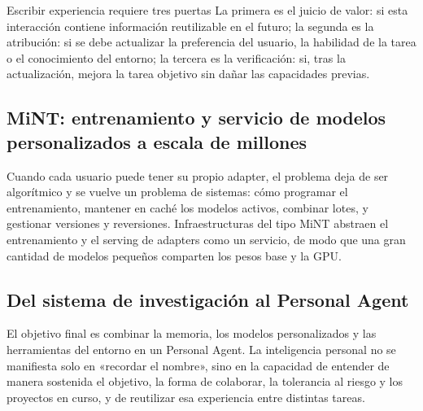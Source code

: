 

\begin{knowledgebox}{Escribir experiencia requiere tres puertas}
La primera es el juicio de valor: si esta interacción contiene información reutilizable en el futuro; la segunda es la atribución: si se debe actualizar la preferencia del usuario, la habilidad de la tarea o el conocimiento del entorno; la tercera es la verificación: si, tras la actualización, mejora la tarea objetivo sin dañar las capacidades previas.
\end{knowledgebox}

\subsection{MiNT: entrenamiento y servicio de modelos personalizados a escala de millones}

Cuando cada usuario puede tener su propio adapter, el problema deja de ser algorítmico y se vuelve un problema de sistemas: cómo programar el entrenamiento, mantener en caché los modelos activos, combinar lotes, y gestionar versiones y reversiones. Infraestructuras del tipo MiNT abstraen el entrenamiento y el serving de adapters como un servicio, de modo que una gran cantidad de modelos pequeños comparten los pesos base y la GPU.




\subsection{Del sistema de investigación al Personal Agent}

El objetivo final es combinar la memoria, los modelos personalizados y las herramientas del entorno en un Personal Agent. La inteligencia personal no se manifiesta solo en «recordar el nombre», sino en la capacidad de entender de manera sostenida el objetivo, la forma de colaborar, la tolerancia al riesgo y los proyectos en curso, y de reutilizar esa experiencia entre distintas tareas.

